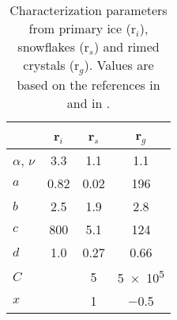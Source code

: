 \begin{table}[h]
	\begin{center}
		\caption{Characterization parameters from primary ice (r$_i$), snowflakes (r$_s$) and rimed crystals (r$_g$). Values are based on the references in \cite{meteo_france_meso-nh_2009} and in \cite{pinty_mixed-phased_1998}. }\label{tab:ice_parameter}
		\begin{tabular}{l|c|c|c}
			\hline \hline
			& \textbf{r$_i$}& \textbf{r$_s$}& \textbf{r$_g$} \\ \hline\hline
			$\alpha$, $\nu$ & \num{3.3}		& \num{1.1}			& \num{1.1} \\ \hline
			$a$				& \num{0.82}	& \num{0.02}		& \num{196} \\ 
			$b$				& \num{2.5}		& \num{1.9}			& \num{2.8} \\ \hline
			$c$				& \num{800}		& \num{5.1}			& \num{124} \\ 
			$d$				& \num{1.0}		& \num{0.27}		& \num{0.66} \\ \hline
			$C$				&				& \num{5}			& \num{5e5} \\
			$x$				&				& \num{1}			& \num{-0.5} \\
			\hline \hline
		\end{tabular}
	\end{center}
\end{table}